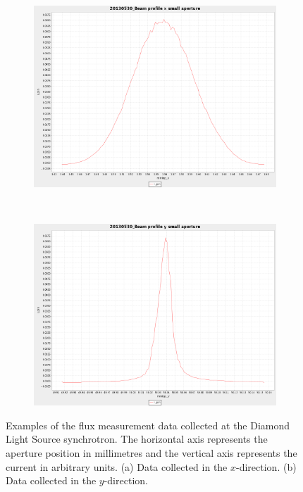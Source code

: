 \begin{figure}
        \centering
        \begin{subfigure}[b]{0.9\textwidth}
                \centering
                \includegraphics[width=\textwidth]{figures/beam/origx.png}
                \caption{}
                \label{fig:Original aperture measurments inx-direction - DLS}
        \end{subfigure}
				\\
        \begin{subfigure}[b]{0.9\textwidth}
                \centering
                \includegraphics[width=\textwidth]{figures/beam/origy.png}
                \caption{}
                \label{fig:Original aperture measurments in y-direction - DLS}
        \end{subfigure}
        \caption{Examples of the flux measurement data collected at the Diamond Light Source synchrotron.
        The horizontal axis represents the aperture position in millimetres and the vertical axis represents the current in arbitrary units.
        (a) Data collected in the $x$-direction.
        (b) Data collected in the $y$-direction.}
        \label{fig:Original aperture measurments - DLS}
\end{figure}

